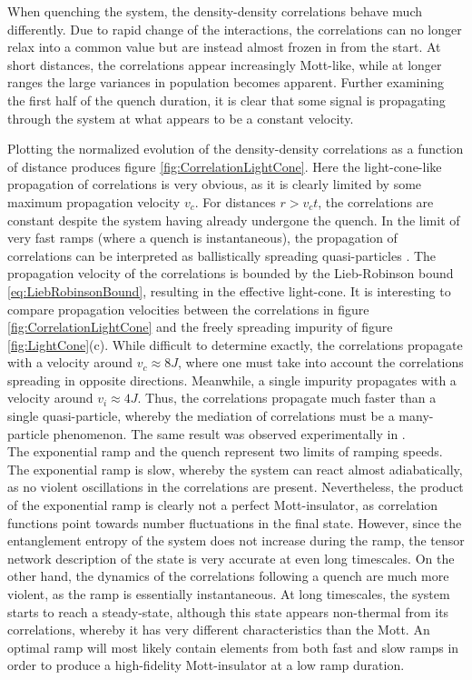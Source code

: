 When quenching the system, the density-density correlations behave much differently. Due to rapid change of the interactions, the correlations can no longer relax into a common value but are instead almost frozen in from the start. At short distances, the correlations appear increasingly Mott-like, while at longer ranges the large variances in population becomes apparent. Further examining the first half of the quench duration, it is clear that some signal is propagating through the system at what appears to be a constant velocity.

Plotting the normalized evolution of the density-density correlations as a function of distance produces figure \ref{fig:CorrelationLightCone}. Here the light-cone-like propagation of correlations is very obvious, as it is clearly limited by some maximum propagation velocity $v_c$. For distances $r >  v_c t$, the correlations are constant despite the system having already undergone the quench. In the limit of very fast ramps (where a quench is instantaneous), the propagation of correlations can be interpreted as ballistically spreading quasi-particles \cite{Cheneau2012,Calabrese2006}. The propagation velocity of the correlations is bounded by the Lieb-Robinson bound \eqref{eq:LiebRobinsonBound}, resulting in the effective light-cone. 
It is interesting to compare propagation velocities between the correlations in figure \ref{fig:CorrelationLightCone} and the freely spreading impurity of figure \ref{fig:LightCone}(c). While difficult to determine exactly, the correlations propagate with a velocity around $v_c \approx 8 J$, where one must take into account the correlations spreading in opposite directions. Meanwhile, a single impurity propagates with a velocity around $v_i \approx 4 J$. Thus, the correlations propagate much faster than a single quasi-particle, whereby the mediation of correlations must be a many-particle phenomenon. The same result was observed experimentally in \cite{Cheneau2012}.\\

The exponential ramp and the quench represent two limits of ramping speeds. The exponential ramp is slow, whereby the system can react almost adiabatically, as no violent oscillations in the correlations are present. Nevertheless, the product of the exponential ramp is clearly not a perfect Mott-insulator, as correlation functions point towards number fluctuations in the final state. However, since the entanglement entropy of the system does not increase during the ramp, the tensor network description of the state is very accurate at even long timescales.
On the other hand, the dynamics of the correlations following a quench are much more violent, as the ramp is essentially instantaneous. At long timescales, the system starts to reach a steady-state, although this state appears non-thermal from its correlations, whereby it has very different characteristics than the Mott. An optimal ramp will most likely contain elements from both fast and slow ramps in order to produce a high-fidelity Mott-insulator at a low ramp duration. 



